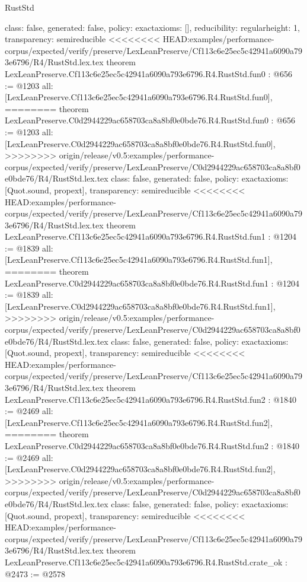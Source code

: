 \begin{lexlean}{RustStd}
\begin{coremodule}
{\begin{coremodule}
{{{  class: false,
  generated: false,
  policy: exact{axioms: []},
  reducibility: regular{height: 1},
  transparency: semireducible
}
<<<<<<<< HEAD:examples/performance-corpus/expected/verify/preserve/LexLeanPreserve/Cf113c6e25ec5c42941a6090a793e6796/R4/RustStd.lex.tex
theorem LexLeanPreserve.Cf113c6e25ec5c42941a6090a793e6796.R4.RustStd.fun0 : @656 := @1203 {
  all: [LexLeanPreserve.Cf113c6e25ec5c42941a6090a793e6796.R4.RustStd.fun0],
========
theorem LexLeanPreserve.C0d2944229ac658703ca8a8bf0e0bde76.R4.RustStd.fun0 : @656 := @1203 {
  all: [LexLeanPreserve.C0d2944229ac658703ca8a8bf0e0bde76.R4.RustStd.fun0],
>>>>>>>> origin/release/v0.5:examples/performance-corpus/expected/verify/preserve/LexLeanPreserve/C0d2944229ac658703ca8a8bf0e0bde76/R4/RustStd.lex.tex
  class: false,
  generated: false,
  policy: exact{axioms: [Quot.sound, propext]},
  transparency: semireducible
}
<<<<<<<< HEAD:examples/performance-corpus/expected/verify/preserve/LexLeanPreserve/Cf113c6e25ec5c42941a6090a793e6796/R4/RustStd.lex.tex
theorem LexLeanPreserve.Cf113c6e25ec5c42941a6090a793e6796.R4.RustStd.fun1 : @1204 := @1839 {
  all: [LexLeanPreserve.Cf113c6e25ec5c42941a6090a793e6796.R4.RustStd.fun1],
========
theorem LexLeanPreserve.C0d2944229ac658703ca8a8bf0e0bde76.R4.RustStd.fun1 : @1204 := @1839 {
  all: [LexLeanPreserve.C0d2944229ac658703ca8a8bf0e0bde76.R4.RustStd.fun1],
>>>>>>>> origin/release/v0.5:examples/performance-corpus/expected/verify/preserve/LexLeanPreserve/C0d2944229ac658703ca8a8bf0e0bde76/R4/RustStd.lex.tex
  class: false,
  generated: false,
  policy: exact{axioms: [Quot.sound, propext]},
  transparency: semireducible
}
<<<<<<<< HEAD:examples/performance-corpus/expected/verify/preserve/LexLeanPreserve/Cf113c6e25ec5c42941a6090a793e6796/R4/RustStd.lex.tex
theorem LexLeanPreserve.Cf113c6e25ec5c42941a6090a793e6796.R4.RustStd.fun2 : @1840 := @2469 {
  all: [LexLeanPreserve.Cf113c6e25ec5c42941a6090a793e6796.R4.RustStd.fun2],
========
theorem LexLeanPreserve.C0d2944229ac658703ca8a8bf0e0bde76.R4.RustStd.fun2 : @1840 := @2469 {
  all: [LexLeanPreserve.C0d2944229ac658703ca8a8bf0e0bde76.R4.RustStd.fun2],
>>>>>>>> origin/release/v0.5:examples/performance-corpus/expected/verify/preserve/LexLeanPreserve/C0d2944229ac658703ca8a8bf0e0bde76/R4/RustStd.lex.tex
  class: false,
  generated: false,
  policy: exact{axioms: [Quot.sound, propext]},
  transparency: semireducible
}
<<<<<<<< HEAD:examples/performance-corpus/expected/verify/preserve/LexLeanPreserve/Cf113c6e25ec5c42941a6090a793e6796/R4/RustStd.lex.tex
theorem LexLeanPreserve.Cf113c6e25ec5c42941a6090a793e6796.R4.RustStd.crate_ok : @2473 := @2578 {
}}}}}}
\end{coremodule}}
\end{coremodule}
\end{lexlean}
